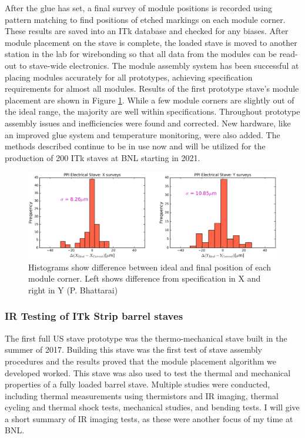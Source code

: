 After the glue has set, a final survey of module positions is recorded using pattern matching to find positions of etched markings on each module corner. These results are saved into an ITk database and checked for any biases. After module placement on the stave is complete, the loaded stave is moved to another station in the lab for wirebonding so that all data from the modules can be read-out to stave-wide electronics. The module assembly system has been successful at placing modules accurately for all prototypes, achieving specification requirements for almost all modules. Results of the first prototype stave's module placement are shown in Figure \ref{fig:placementresults}. While a few module corners are slightly out of the ideal range, the majority are well within specifications. Throughout prototype assembly issues and inefficiencies were found and corrected. New hardware, like an improved glue system and temperature monitoring, were also added. The methods described continue to be in use now and will be utilized for the production of 200 ITk staves at BNL starting in 2021. 

\begin{figure}[!h]
        \centering
    \includegraphics[width=.8\textwidth]{Pictures/placementresults.png}
    \caption{Histograms show difference between ideal and final position of each module corner. Left shows difference from specification in X and right in Y (P. Bhattarai)}
    \label{fig:placementresults}
\end{figure}

\subsubsection{IR Testing of ITk Strip barrel staves}
The first full US stave prototype was the thermo-mechanical stave built in the summer of 2017.  Building this stave was the first test of stave assembly procedures and the results proved that the module placement algorithm we developed worked. This stave was also used to test the thermal and mechanical properties of a fully loaded barrel stave. Multiple studies were conducted, including thermal measurements using thermistors and IR imaging, thermal cycling and thermal shock tests, mechanical studies, and bending tests. I will give a short summary of IR imaging tests, as these were another focus of my time at BNL. 

